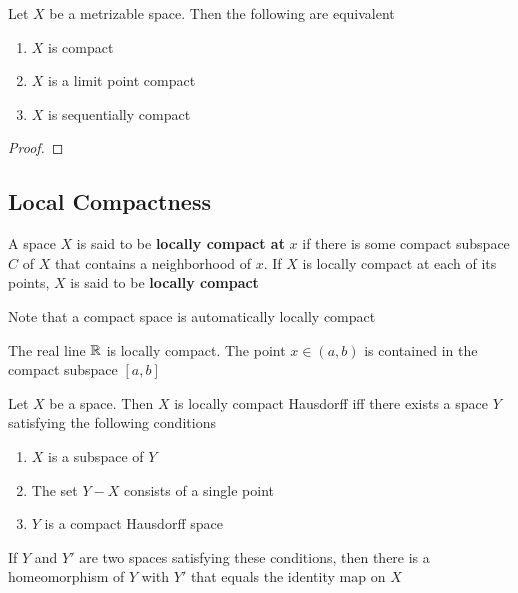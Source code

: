 \documentclass[11pt]{article}
\begin{document}
\begin{theorem}[]
\label{thm28.2}
Let \(X\) be a metrizable space. Then the following are equivalent
\begin{enumerate}
\item \(X\) is compact
\item \(X\) is a limit point compact
\item \(X\) is sequentially compact
\end{enumerate}
\end{theorem}

\begin{proof}

\end{proof}

\subsection{Local Compactness}
\label{sec:org419a316}
\begin{definition}[]
A space \(X\) is said to be \textbf{locally compact at} \(x\) if there is some compact subspace \(C\)
of \(X\) that contains a neighborhood of \(x\). If \(X\) is locally compact at each of its
points, \(X\) is said to be \textbf{locally compact}
\end{definition}

Note that a compact space is automatically locally compact

\begin{examplle}[]
The real line \(\mathbb{R}\) is locally compact. The point \(x\in(a,b)\) is contained in the compact
subspace \([a,b]\)
\end{examplle}

\begin{theorem}[]
\label{thm29.1}
Let \(X\) be a space. Then \(X\) is locally compact Hausdorff iff there exists a space \(Y\)
satisfying the following conditions
\begin{enumerate}
\item \(X\) is a subspace of \(Y\)
\item The set \(Y-X\) consists of a single point
\item \(Y\) is a compact Hausdorff space
\end{enumerate}


If \(Y\) and \(Y'\) are two spaces satisfying these conditions, then there is a homeomorphism
of \(Y\) with \(Y'\) that equals the identity map on \(X\)
\end{theorem}
\end{document}
